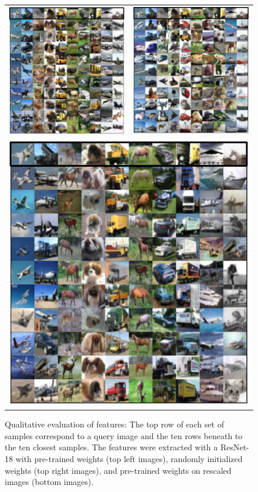 \begin{figure}[h!]
    \centering
    \caption[Qualitative evaluation of features]{\label{fig:exp_feat_extr_retrieval} Qualitative evaluation of features: The top row of each set of samples correspond to a query image and the ten rows beneath to the ten closest samples. The features were extracted with a ResNet-18 with pre-trained weights (top left images), randomly initialized weights (top right images), and pre-trained weights on rescaled images (bottom images). }    
    \begin{tabular}{ll}
        \includegraphics[width=.4\columnwidth]{fig_featureextract/ResNet18_pretrain_32x32.png} & \includegraphics[width=.4\columnwidth]{fig_featureextract/ResNet18_randinit_32x32.png} \\
        \multicolumn{2}{c}{\includegraphics[width=.4\columnwidth]{fig_featureextract/ResNet18_pretrain_256x256.png}} \\
    \end{tabular}
\end{figure}


